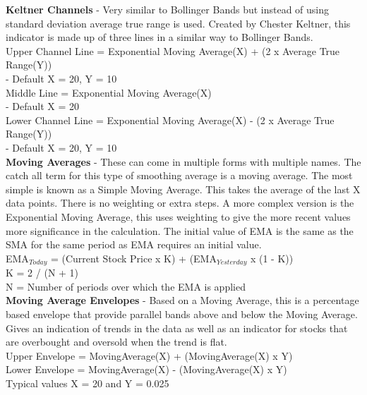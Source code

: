 \documentclass[12pt,a4paper]{article}
\begin{document}
\noindent
\textbf{Keltner Channels} - Very similar to Bollinger Bands but instead of using standard deviation average true range is used. Created by Chester Keltner, this indicator is made up of three lines in a similar way to Bollinger Bands.\\

\noindent
Upper Channel Line = Exponential Moving Average(X) + (2 x Average True Range(Y))\\ - Default X = 20, Y = 10 \\
Middle Line = Exponential Moving Average(X)\\ - Default X = 20 \\
Lower Channel Line = Exponential Moving Average(X) - (2 x Average True Range(Y))\\ - Default X = 20, Y = 10 \\

\iffalse
[]
\fi

\noindent
\textbf{Moving Averages} - These can come in multiple forms with multiple names. The catch all term for this type of smoothing average is a moving average. The most simple is known as a Simple Moving Average. This takes the average of the last X data points. There is no weighting or extra steps. A more complex version is the Exponential Moving Average, this uses weighting to give the more recent values more significance in the calculation. The initial value of EMA is the same as the SMA for the same period as EMA requires an initial value.\\

\noindent
EMA$_{Today}$ = (Current Stock Price x K) + (EMA$_{Yesterday}$ x (1 - K)) \\
K = 2 / (N + 1) \\
N = Number of periods over which the EMA is applied \\

\iffalse
[]
\fi

\noindent
\textbf{Moving Average Envelopes} - Based on a Moving Average, this is a percentage based envelope that provide parallel bands above and below the Moving Average. Gives an indication of trends in the data as well as an indicator for stocks that are overbought and oversold when the trend is flat.\\

\noindent
Upper Envelope = MovingAverage(X) + (MovingAverage(X) x Y)\\
Lower Envelope = MovingAverage(X) - (MovingAverage(X) x Y)\\
Typical values X = 20 and Y = 0.025\\
\end{document}
